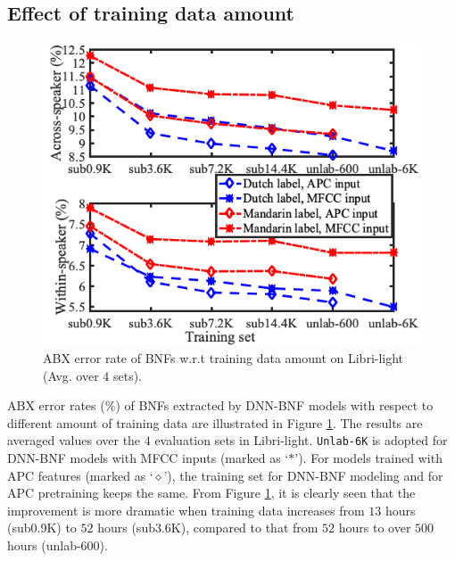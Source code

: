 \documentclass[a4paper]{article}
\begin{document}





\subsection{Effect of  training data amount}
\begin{figure}[!t]
    \centering
    \includegraphics[width=0.75\linewidth]{LaTeX/crsling_dnn_bnf_apc_input_vert.png}
    \caption{ABX error rate of BNFs w.r.t training data amount on Libri-light (Avg. over $4$ sets).}
    \label{fig:dnn_bnf_data_amount}
\end{figure}
ABX error rates ($\%$) of BNFs extracted by  DNN-BNF models with respect to different amount of training data are illustrated in Figure \ref{fig:dnn_bnf_data_amount}. The results are averaged values over the $4$ evaluation sets in  Libri-light. \texttt{Unlab-6K}  is  adopted for DNN-BNF models with MFCC inputs (marked as `$\ast$'). For models trained with APC features (marked as `$\diamond$'), the training set for DNN-BNF modeling and for APC pretraining keeps the same. From Figure \ref{fig:dnn_bnf_data_amount}, it is clearly seen that 
the improvement is more dramatic when training data increases from $13$  hours (sub0.9K) to $52$ hours (sub3.6K), compared to   that from $52$ hours to over $500$ hours (unlab-600). 
\end{document}
